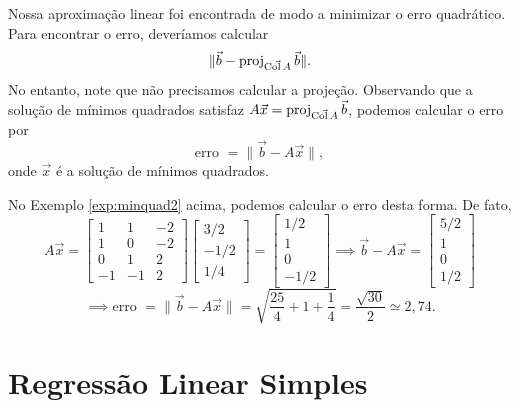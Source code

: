Nossa aproximação linear foi encontrada de modo a minimizar o erro quadrático. Para encontrar o erro, deveríamos calcular
\begin{equation}
\| \vec{b} - \operatorname{proj}_{\vec{\operatorname{Col} A}} \vec{b} \|.
\end{equation} No entanto, note que não precisamos calcular a projeção. Observando que a solução de mínimos quadrados satisfaz $A \vec{x} = \operatorname{proj}_{\vec{\operatorname{Col} A}} \vec{b}$, podemos calcular o erro por
\begin{equation}
\text{erro } = \| \vec{b} - A \vec{x} \|,
\end{equation} onde $\vec{x}$ é a solução de mínimos quadrados.

No Exemplo \ref{exp:minquad2} acima, podemos calcular o erro desta forma. De fato,
\begin{equation}
A \vec{x} = 
\begin{bmatrix}
  1 & 1 & -2 \\ 
  1 & 0 & -2 \\ 
  0 & 1 &  2 \\ 
  -1 & -1&  2
\end{bmatrix}
\begin{bmatrix}
  3/2 \\ -1/2 \\ 1/4
\end{bmatrix} = 
\begin{bmatrix}
  1/2 \\ 1 \\ 0 \\ -1/2
\end{bmatrix} \implies 
\vec{b} - A\vec{x} = 
\begin{bmatrix}
  5/2 \\ 1 \\ 0 \\ 1/2
\end{bmatrix}
\end{equation}
\begin{equation}
\implies \text{erro } = \| \vec{b} - A \vec{x} \| = \sqrt{\frac{25}{4} + 1 + \frac{1}{4}} = \frac{\sqrt{30}}{2} \simeq 2,74.
\end{equation}





\section{Regressão Linear Simples}

